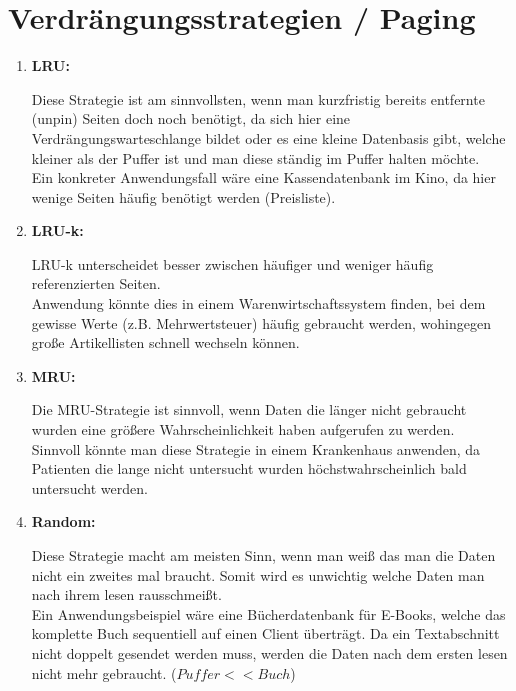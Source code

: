 \documentclass{scrartcl}
\begin{document}
\section{Verdrängungsstrategien / Paging}
\begin{enumerate}
    \item \textbf{LRU:}
    
    Diese Strategie ist am sinnvollsten, wenn man kurzfristig bereits entfernte (unpin) Seiten doch noch benötigt, da sich hier eine Verdrängungswarteschlange bildet oder es eine kleine Datenbasis gibt, welche kleiner als der Puffer ist und man diese ständig im Puffer halten möchte.\\
    Ein konkreter Anwendungsfall wäre eine Kassendatenbank im Kino, da hier wenige Seiten häufig benötigt werden (Preisliste).
    \item \textbf{LRU-k:}
    
    LRU-k unterscheidet besser zwischen häufiger und weniger häufig referenzierten Seiten.\\Anwendung könnte dies in einem Warenwirtschaftssystem finden, bei dem gewisse Werte (z.B. Mehrwertsteuer) häufig gebraucht werden, wohingegen große Artikellisten schnell wechseln können.
    \item \textbf{MRU:}
    
    Die MRU-Strategie ist sinnvoll, wenn Daten die länger nicht gebraucht wurden eine größere Wahrscheinlichkeit haben aufgerufen zu werden.\\
    Sinnvoll könnte man diese Strategie in einem Krankenhaus anwenden, da Patienten die lange nicht untersucht wurden höchstwahrscheinlich bald untersucht werden.
    \item \textbf{Random:}
    
    Diese Strategie macht am meisten Sinn, wenn man weiß das man die Daten nicht ein zweites mal braucht. Somit wird es unwichtig welche Daten man nach ihrem lesen rausschmeißt.\\
    Ein Anwendungsbeispiel wäre eine Bücherdatenbank für E-Books, welche das komplette Buch sequentiell auf einen Client überträgt. Da ein Textabschnitt nicht doppelt gesendet werden muss, werden die Daten nach dem ersten lesen nicht mehr gebraucht. ($Puffer << Buch$)
\end{enumerate}
\end{document}
